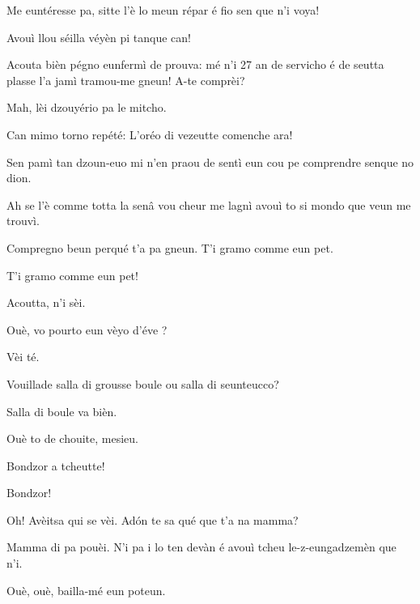 \begin{drama}
\Eunfeurmiespeaks {} Me euntéresse pa, sitte l'è lo meun répar é fio sen que n’i voya!

\Eunfeurmispeaks Avouì llou  séilla véyèn pi tanque can!

\Eunfeurmiespeaks Acouta bièn pégno eunfermì de prouva: mé n'i 27 an de servicho é de seutta plasse l’a jamì tramou-me gneun! A-te comprèi?

\Eunfeurmispeaks Mah, lèi dzouyério pa le mitcho.

\Eunfeurmiespeaks Can mimo torno repété:  L’oréo di vezeutte comenche ara!


\Gerominespeaks Sen pamì tan dzoun-euo mi n’en praou de sentì eun cou pe comprendre senque no dion.

\Casimirspeaks Ah se l’è comme totta la senâ vou cheur me lagnì avouì to si mondo que veun me trouvì.

\Gerominespeaks Compregno beun perqué t’a pa gneun. T’i gramo comme eun pet.

\Casimirspeaks {} T'i gramo comme eun pet!

\PersEmpourtantaspeaks {} Acoutta, n’i sèi.

\Eunfeurmispeaks Ouè,  vo pourto eun vèyo d'éve \bicchiere ?

\PersEmpourtantaspeaks Vèi té.

\Eunfeurmispeaks Vouillade salla di grousse boule ou salla di seunteucco?

\PersEmpourtantaspeaks Salla di boule va bièn.

\Eunfeurmispeaks Ouè to de chouite, mesieu.


\Feliespeaks Bondzor a tcheutte!

\Casimirspeaks {} Bondzor!

\Gerominespeaks Oh! Avèitsa qui se vèi. Ad\'on te sa qué que t’a na mamma?

\Feliespeaks Mamma di pa pouèi. N’i pa i lo ten devàn é avouì tcheu le-z-eungadzemèn que n'i.

\Gerominespeaks Ouè, ouè, bailla-mé eun poteun.


\end{drama}
